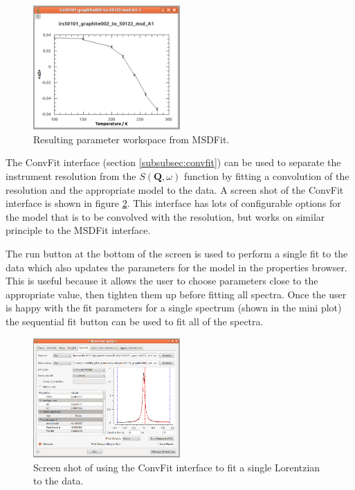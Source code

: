 \documentclass[paper=a4, fontsize=11pt]{scrartcl}	%
\numberwithin{equation}{section}															%
\numberwithin{figure}{section}																%
\numberwithin{table}{section}																%
\begin{document}
\begin{figure}[H]
\centering
\includegraphics[width=0.5\textwidth]{img/iris-ida-msd-output.png}
\caption{Resulting parameter workspace from MSDFit.}
\label{fig:iris-ida-msd-output}
\end{figure}

The ConvFit interface (section \ref{subsubsec:convfit}) can be used to separate the instrument resolution from the $S(\mathbf{Q}, \omega)$ function by fitting a convolution of the resolution and the appropriate model to the data. A screen shot of the ConvFit interface is shown in figure \ref{fig:iris-ida-convfit}. This interface has lots of configurable options for the model that is to be convolved with the resolution, but works on similar principle to the MSDFit interface. 

The run button at the bottom of the screen is used to perform a single fit to the data which also updates the parameters for the model in the properties browser. This is useful because it allows the user to choose parameters close to the appropriate value, then tighten them up before fitting all spectra. Once the user is happy with the fit parameters for a single spectrum (shown in the mini plot) the sequential fit button can be used to fit all of the spectra.

\begin{figure}[H]
\centering
\includegraphics[width=0.5\textwidth]{img/iris-ida-convfit.png}
\caption{Screen shot of using the ConvFit interface to fit a single Lorentzian to the data.}
\label{fig:iris-ida-convfit}
\end{figure}
\end{document}
